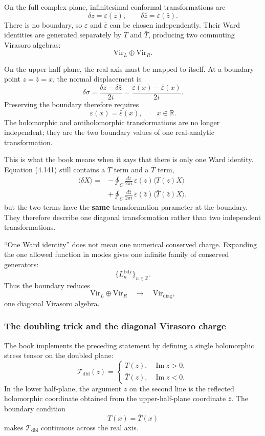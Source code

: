 \documentclass[
  10pt,
  a4paper,
  openany]{book}
\begin{document}
On the full complex plane, infinitesimal conformal transformations are
\[
\delta z=\varepsilon(z),
\qquad
\delta\bar z=\bar\varepsilon(\bar z).
\] There is no boundary, so \(\varepsilon\) and \(\bar\varepsilon\) can
be chosen independently. Their Ward identities are generated separately
by \(T\) and \(\bar T\), producing two commuting Virasoro algebras: \[
\mathrm{Vir}_L\oplus\mathrm{Vir}_R.
\]

On the upper half-plane, the real axis must be mapped to itself. At a
boundary point \(z=\bar z=x\), the normal displacement is \[
\delta\sigma
=\frac{\delta z-\delta\bar z}{2i}
=\frac{\varepsilon(x)-\bar\varepsilon(x)}{2i}.
\] Preserving the boundary therefore requires \[
\boxed{
\varepsilon(x)=\bar\varepsilon(x),
\qquad x\in\mathbb R.
}
\] The holomorphic and antiholomorphic transformations are no longer
independent; they are the two boundary values of one real-analytic
transformation.

This is what the book means when it says that there is only one Ward
identity. Equation (4.141) still contains a \(T\) term and a \(\bar T\)
term, \[
\begin{aligned}
\langle\delta X\rangle
={}&
-\oint_C\frac{dz}{2\pi i}\,
\varepsilon(z)\langle T(z)X\rangle\\%
&+
\oint_C\frac{d\bar z}{2\pi i}\,
\bar\varepsilon(\bar z)
\langle\bar T(\bar z)X\rangle,
\end{aligned}
\] but the two terms have the \textbf{same} transformation parameter at
the boundary. They therefore describe one diagonal transformation rather
than two independent transformations.

``One Ward identity'' does not mean one numerical conserved charge.
Expanding the one allowed function in modes gives one infinite family of
conserved generators: \[
\{L_n^{\mathrm{bdy}}\}_{n\in\mathbb Z}.
\] Thus the boundary reduces \[
\mathrm{Vir}_L\oplus\mathrm{Vir}_R
\quad\longrightarrow\quad
\mathrm{Vir}_{\mathrm{diag}},
\] one diagonal Virasoro algebra.

\subsubsection{The doubling trick and the diagonal Virasoro
charge}\label{the-doubling-trick-and-the-diagonal-virasoro-charge}

The book implements the preceding statement by defining a single
holomorphic stress tensor on the doubled plane: \[
\mathcal T_{\mathrm{dbl}}(z)
=
\begin{cases}
T(z),&\operatorname{Im}z>0,\\[1mm]
\bar T(z),&\operatorname{Im}z<0.
\end{cases}
\] In the lower half-plane, the argument \(z\) on the second line is the
reflected holomorphic coordinate obtained from the upper-half-plane
coordinate \(\bar z\). The boundary condition \[
T(x)=\bar T(x)
\] makes \(\mathcal T_{\mathrm{dbl}}\) continuous across the real axis.
\end{document}
